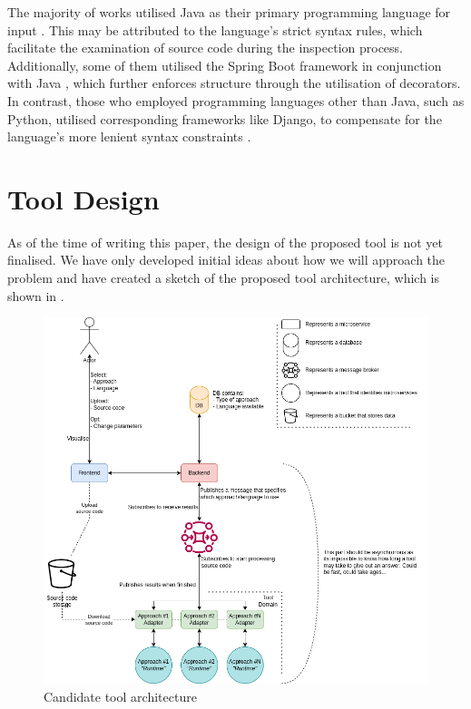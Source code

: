 \documentclass[conference]{IEEEtran}
\begin{document}
The majority of works utilised Java as their primary programming language for
input . This may be
attributed to the language's strict syntax rules, which facilitate the
examination of source code during the inspection process. Additionally, some of
them utilised the Spring Boot framework in conjunction with Java
, which
further enforces structure through the utilisation of decorators. In contrast,
those who employed programming languages other than Java, such as Python,
utilised corresponding frameworks like Django, to compensate for the language's
more lenient syntax constraints .

\section{Tool Design}

As of the time of writing this paper, the design of the proposed tool is not
yet finalised. We have only developed initial ideas about how we will approach
the problem and have created a sketch of the proposed tool architecture, which
is shown in .

\begin{figure}[!htb]
  \caption{Candidate tool architecture}
  \label{fig:tool-architecture}
  \centering
  \includegraphics[width=\textwidth]{thesis-architecture.drawio}
\end{figure}
\end{document}
